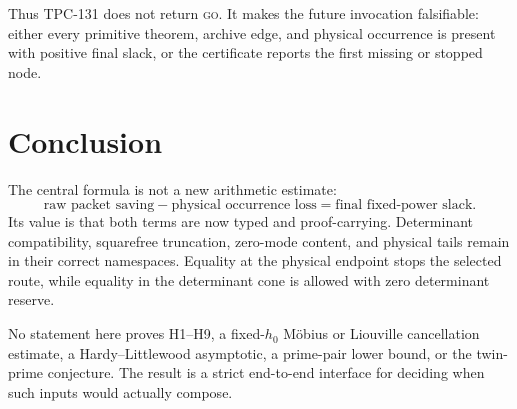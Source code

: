 \documentclass[11pt]{article}
\theoremstyle{definition}
\theoremstyle{remark}
\begin{document}
Thus TPC-131 does not return \textsc{go}.  It makes the future
invocation falsifiable: either every primitive theorem, archive edge,
and physical occurrence is present with positive final slack, or the
certificate reports the first missing or stopped node.

\section{Conclusion}

The central formula is not a new arithmetic estimate:
\[
 \text{raw packet saving}
 -
 \text{physical occurrence loss}
 =
 \text{final fixed-power slack}.
\]
Its value is that both terms are now typed and proof-carrying.
Determinant compatibility, squarefree truncation, zero-mode content,
and physical tails remain in their correct namespaces.  Equality at
the physical endpoint stops the selected route, while equality in
the determinant cone is allowed with zero determinant reserve.

No statement here proves H1--H9, a fixed-\(h_0\) M\"obius or
Liouville cancellation estimate, a Hardy--Littlewood asymptotic, a
prime-pair lower bound, or the twin-prime conjecture.  The result is a
strict end-to-end interface for deciding when such inputs would
actually compose.

\begingroup
\small
\setlength{\bibsep}{2pt plus 0.3ex}
\sloppy


\endgroup
\end{document}
